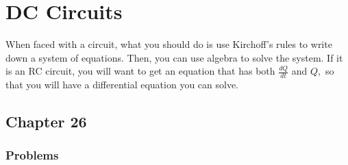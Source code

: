 \documentclass[12pt]{book}
\begin{document}
\chapter{DC Circuits}

When faced with a circuit, what you should do is use Kirchoff's rules to write down a system of equations. Then, you can use algebra to solve the system. If it is an RC circuit, you will want to get an equation that has both $\frac{dQ}{dt}$ and $Q,$ so that you will have a differential equation you can solve.

\section{Chapter 26}

\subsection{Problems}
\end{document}
